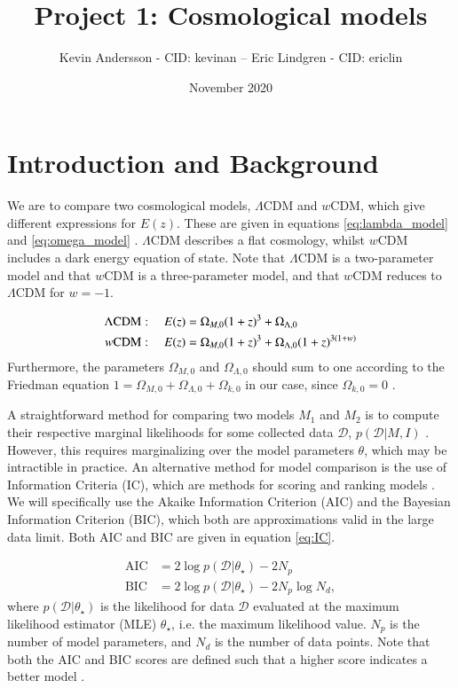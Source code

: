 \documentclass[11pt,a4paper]{article}
\title{Project 1: Cosmological models}
\author{Kevin Andersson - CID: kevinan -- Eric Lindgren - CID: ericlin}
\date{November 2020}
\begin{document}
\maketitle

\section{Introduction and Background}

We are to compare two cosmological models, $\Lambda$CDM and $w$CDM, which give different expressions for $E(z)$. These are given in equations \eqref{eq:lambda_model} and \eqref{eq:omega_model} \cite{project_pm}. $\Lambda$CDM describes a flat cosmology, whilst $w$CDM includes a dark energy equation of state. Note that $\Lambda$CDM is a two-parameter model and that $w$CDM is a three-parameter model, and that $w$CDM reduces to $\Lambda$CDM for $w=-1$. 

\begin{align}
    \label{eq:lambda_model}
    \Lambda\text{CDM}: \hspace{10px} E(z) &= \Omega_{M,0}(1+z)^3 + \Omega_{\Lambda,0} \\
    \label{eq:omega_model}
    w\text{CDM}: \hspace{10px} E(z) &= \Omega_{M,0}(1+z)^3 + \Omega_{\Lambda,0}(1+z)^{3(1+w)} 
\end{align}
Furthermore, the parameters $\Omega_{M,0}$ and $\Omega_{\Lambda,0}$ should sum to one according to the Friedman equation $1 = \Omega_{M,0} + \Omega_{\Lambda,0} + \Omega_{k,0}$ in our case, since $\Omega_{k,0} = 0$ \cite{project_pm}.

A straightforward method for comparing two models $M_1$ and $M_2$ is to compute their respective marginal likelihoods for some collected data $\mathcal{D}$, $p\left(\mathcal{D} \vert M, I \right)$ \cite{lec3}. However, this requires marginalizing over the model parameters $\theta$, which may be intractible in practice. An alternative method for model comparison is the use of Information Criteria (IC), which are methods for scoring and ranking models \cite{lec3}. We will specifically use the Akaike Information Criterion (AIC) and the Bayesian Information Criterion (BIC), which both are approximations valid in the large data limit. Both AIC and BIC are given in equation \eqref{eq:IC}. 

\begin{align}
    \label{eq:AIC}
    \text{AIC} &= 2 \log{p\left(\mathcal{D} \vert \theta_{\star} \right)} - 2N_p \\
    \label{eq:BIC}
    \text{BIC} &= 2 \log{p\left(\mathcal{D} \vert \theta_{\star} \right)} - 2N_p \log{N_d},
\end{align}
where $p\left(\mathcal{D} \vert \theta_{\star} \right)$ is the likelihood for data $\mathcal{D}$ evaluated at the maximum likelihood estimator (MLE) $\theta_\star$, i.e. the maximum likelihood value. $N_p$ is the number of model parameters, and $N_d$ is the number of data points. Note that both the AIC and BIC scores are defined such that a higher score indicates a better model \cite{lec3}.
\end{document}

